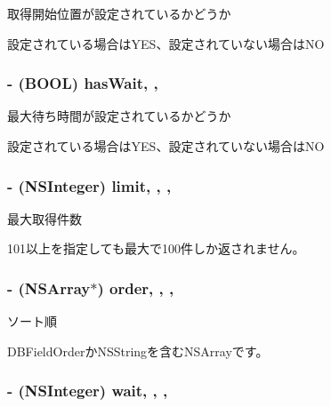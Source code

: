 取得開始位置が設定されているかどうか 

設定されている場合は\-Y\-E\-S、設定されていない場合は\-N\-O \hypertarget{interface_b_d_query_ac2158b8379abefe6d5bde1cd9d39028c}{
\subsubsection[{has\-Wait}]{\setlength{\rightskip}{0pt plus 5cm}-\/ (B\-O\-O\-L) has\-Wait\hspace{0.3cm}{\ttfamily [read]}, {\ttfamily [atomic]}, {\ttfamily [assign]}}}\label{interface_b_d_query_ac2158b8379abefe6d5bde1cd9d39028c}


最大待ち時間が設定されているかどうか 

設定されている場合は\-Y\-E\-S、設定されていない場合は\-N\-O \hypertarget{interface_b_d_query_ae5afba095663a23c7fcac3feaa625d84}{
\subsubsection[{limit}]{\setlength{\rightskip}{0pt plus 5cm}-\/ (N\-S\-Integer) limit\hspace{0.3cm}{\ttfamily [read]}, {\ttfamily [write]}, {\ttfamily [nonatomic]}, {\ttfamily [assign]}}}\label{interface_b_d_query_ae5afba095663a23c7fcac3feaa625d84}


最大取得件数 

101以上を指定しても最大で100件しか返されません。 \hypertarget{interface_b_d_query_a6170a634653da9662cafc6fdea1b4809}{
\subsubsection[{order}]{\setlength{\rightskip}{0pt plus 5cm}-\/ (N\-S\-Array$\ast$) order\hspace{0.3cm}{\ttfamily [read]}, {\ttfamily [write]}, {\ttfamily [nonatomic]}, {\ttfamily [assign]}}}\label{interface_b_d_query_a6170a634653da9662cafc6fdea1b4809}


ソート順 

D\-B\-Field\-Orderか\-N\-S\-Stringを含む\-N\-S\-Arrayです。 \hypertarget{interface_b_d_query_a3d8a8401c6707f4903db51621eac9a62}{
\subsubsection[{wait}]{\setlength{\rightskip}{0pt plus 5cm}-\/ (N\-S\-Integer) wait\hspace{0.3cm}{\ttfamily [read]}, {\ttfamily [write]}, {\ttfamily [nonatomic]}, {\ttfamily [assign]}}}\label{interface_b_d_query_a3d8a8401c6707f4903db51621eac9a62}


